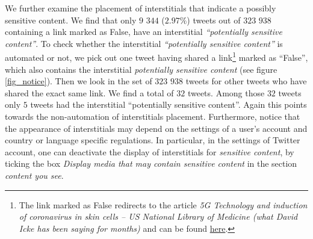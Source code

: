 \documentclass{article}
\begin{document}
We further examine the placement of interstitials that indicate a possibly sensitive content. We find that only $9$ $344$ ($2.97\%$) tweets out of $323$ $938$ containing a link marked as False, have an interstitial {\it ``potentially sensitive content''}. To check whether the interstitial {\it ``potentially sensitive content''} is automated or not, we pick out one tweet having shared a link\footnote{The link marked as False redirects to the article {\it 5G Technology and induction of coronavirus in skin cells – US National Library of Medicine (what David Icke has been saying for months) } and can be found \href{https://davidicke.com/2020/07/22/5g-technology-and-induction-of-coronavirus-in-skin-cells-us-national-library-of-medicine-what-david-icke-has-been-saying-for-months/}{here}.} marked as ``False'', which also contains the interstitial {\it potentially sensitive content} (see figure \ref{fig_notice}). Then we look in the set of $323$ $938$ tweets for other tweets who have shared the exact same link. We find a total of $32$ tweets. Among those $32$ tweets only $5$ tweets had the interstitial ``potentially sensitive content''. Again this points towards the non-automation of interstitials placement. Furthermore, notice that the appearance of interstitials may depend on the settings of a user's account and country or language specific regulations. In particular, in the settings of Twitter account, one can deactivate the display of interstitials for {\it sensitive content}, by ticking the box {\it Display media that may contain sensitive content} in the section {\it content you see}. 

\smallskip
\end{document}

